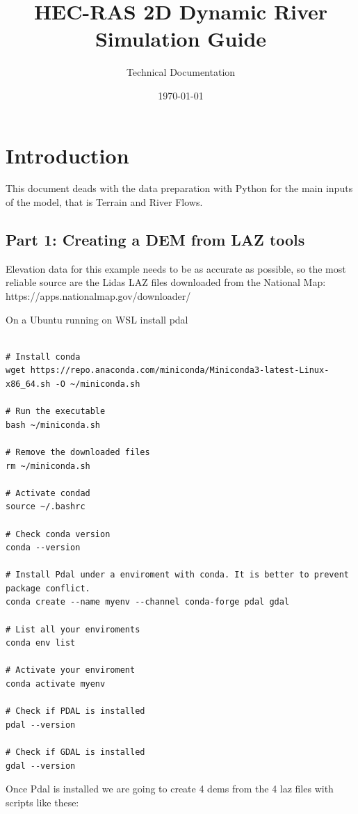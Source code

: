 \documentclass[11pt, a4paper]{article}
\title{\textbf{HEC-RAS 2D Dynamic River Simulation Guide}}
\author{Technical Documentation}
\date{\today}
\begin{document}
\maketitle

\section{Introduction}
This document deads with the data preparation with Python for the main inputs of the model, that is Terrain and River Flows.

\subsection{Part 1: Creating a DEM from LAZ tools}

Elevation data for this example needs to be as accurate as possible, so the most reliable source are the Lidas LAZ files downloaded from the National Map: https://apps.nationalmap.gov/downloader/

On a Ubuntu running on WSL install pdal 

\begin{lstlisting}[style=bashdark, title={Linux Terminal Session}]

# Install conda
wget https://repo.anaconda.com/miniconda/Miniconda3-latest-Linux-x86_64.sh -O ~/miniconda.sh

# Run the executable
bash ~/miniconda.sh

# Remove the downloaded files
rm ~/miniconda.sh

# Activate condad
source ~/.bashrc

# Check conda version
conda --version

# Install Pdal under a enviroment with conda. It is better to prevent package conflict.
conda create --name myenv --channel conda-forge pdal gdal

# List all your enviroments
conda env list

# Activate your enviroment
conda activate myenv

# Check if PDAL is installed
pdal --version

# Check if GDAL is installed
gdal --version

\end{lstlisting}

Once Pdal is installed we are going to create 4 dems from the 4 laz files with scripts like these:
\end{document}
